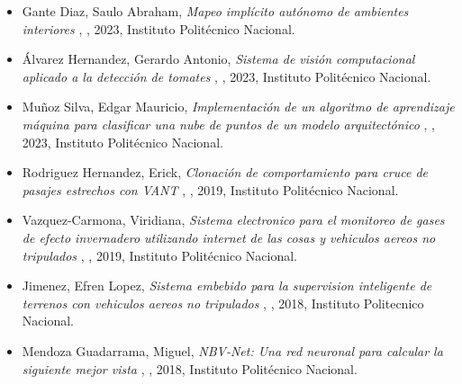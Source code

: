 \begin{itemize} 
\item Gante Diaz, Saulo Abraham, \textit{ Mapeo implícito autónomo de ambientes interiores }, \href{ https://jivg.org/wp-content/uploads/2023/02/2023_maestria_Gante.pdf }{\faFilePdfO}, 2023, Instituto Polit\'ecnico Nacional. 
\item Álvarez Hernandez, Gerardo Antonio, \textit{ Sistema de visión computacional aplicado a
la detección de tomates }, \href{ https://jivg.org/wp-content/uploads/2024/01/2023_maestria_Alvarez.pdf }{\faFilePdfO}, 2023, Instituto Polit\'ecnico Nacional. 
\item Muñoz Silva, Edgar Mauricio, \textit{ Implementación de un algoritmo de aprendizaje máquina para clasificar una nube de puntos de un modelo arquitectónico }, \href{ https://jivg.org/wp-content/uploads/2024/01/2023_maestria_Silva.pdf }{\faFilePdfO}, 2023, Instituto Polit\'ecnico Nacional. 
\item Rodriguez Hernandez, Erick, \textit{ Clonación de comportamiento para cruce de pasajes estrechos con VANT }, \href{ https://jivasquez.files.wordpress.com/2019/08/tesiserhempastar.pdf }{\faFilePdfO}, 2019, Instituto Politécnico Nacional. 
\item Vazquez-Carmona, Viridiana, \textit{ Sistema electronico para el monitoreo de gases de efecto invernadero utilizando internet de las cosas y vehiculos aereos no tripulados }, \href{ https://jivasquez.files.wordpress.com/2020/09/2019_maestria_vazquez.pdf }{\faFilePdfO}, 2019, Instituto Polit\'ecnico Nacional. 
\item Jimenez, Efren Lopez, \textit{ Sistema embebido para la supervision inteligente de terrenos con vehiculos aereos no tripulados }, \href{ https://jivasquez.files.wordpress.com/2018/12/master_thesis_2018_lopez.pdf }{\faFilePdfO}, 2018, Instituto Politecnico Nacional. 
\item Mendoza Guadarrama, Miguel, \textit{ NBV-Net: Una red neuronal para calcular la siguiente mejor vista }, \href{ https://jivasquez.files.wordpress.com/2018/12/2018_maestria_Mendoza.pdf }{\faFilePdfO}, 2018, Instituto Politécnico Nacional. 
\end{itemize} 
